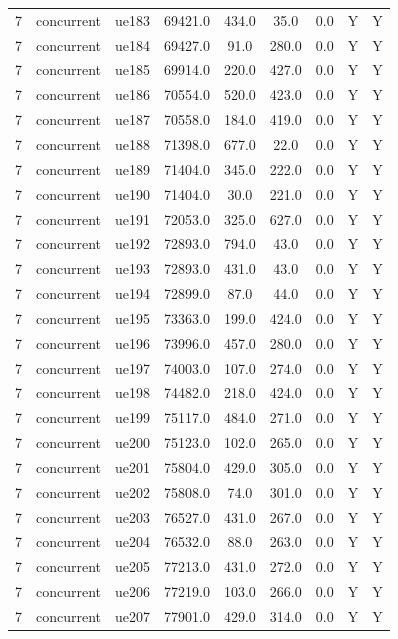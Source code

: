 \begin{table}[ht]
\begin{tabular}{|c|c|c|c|c|c|c|c|c|}
7 & concurrent & ue183 & 69421.0 & 434.0 & 35.0 & 0.0 & Y & Y \\
7 & concurrent & ue184 & 69427.0 & 91.0 & 280.0 & 0.0 & Y & Y \\
7 & concurrent & ue185 & 69914.0 & 220.0 & 427.0 & 0.0 & Y & Y \\
7 & concurrent & ue186 & 70554.0 & 520.0 & 423.0 & 0.0 & Y & Y \\
7 & concurrent & ue187 & 70558.0 & 184.0 & 419.0 & 0.0 & Y & Y \\
7 & concurrent & ue188 & 71398.0 & 677.0 & 22.0 & 0.0 & Y & Y \\
7 & concurrent & ue189 & 71404.0 & 345.0 & 222.0 & 0.0 & Y & Y \\
7 & concurrent & ue190 & 71404.0 & 30.0 & 221.0 & 0.0 & Y & Y \\
7 & concurrent & ue191 & 72053.0 & 325.0 & 627.0 & 0.0 & Y & Y \\
7 & concurrent & ue192 & 72893.0 & 794.0 & 43.0 & 0.0 & Y & Y \\
7 & concurrent & ue193 & 72893.0 & 431.0 & 43.0 & 0.0 & Y & Y \\
7 & concurrent & ue194 & 72899.0 & 87.0 & 44.0 & 0.0 & Y & Y \\
7 & concurrent & ue195 & 73363.0 & 199.0 & 424.0 & 0.0 & Y & Y \\
7 & concurrent & ue196 & 73996.0 & 457.0 & 280.0 & 0.0 & Y & Y \\
7 & concurrent & ue197 & 74003.0 & 107.0 & 274.0 & 0.0 & Y & Y \\
7 & concurrent & ue198 & 74482.0 & 218.0 & 424.0 & 0.0 & Y & Y \\
7 & concurrent & ue199 & 75117.0 & 484.0 & 271.0 & 0.0 & Y & Y \\
7 & concurrent & ue200 & 75123.0 & 102.0 & 265.0 & 0.0 & Y & Y \\
7 & concurrent & ue201 & 75804.0 & 429.0 & 305.0 & 0.0 & Y & Y \\
7 & concurrent & ue202 & 75808.0 & 74.0 & 301.0 & 0.0 & Y & Y \\
7 & concurrent & ue203 & 76527.0 & 431.0 & 267.0 & 0.0 & Y & Y \\
7 & concurrent & ue204 & 76532.0 & 88.0 & 263.0 & 0.0 & Y & Y \\
7 & concurrent & ue205 & 77213.0 & 431.0 & 272.0 & 0.0 & Y & Y \\
7 & concurrent & ue206 & 77219.0 & 103.0 & 266.0 & 0.0 & Y & Y \\
7 & concurrent & ue207 & 77901.0 & 429.0 & 314.0 & 0.0 & Y & Y \\

\end{tabular}
\end{table}
